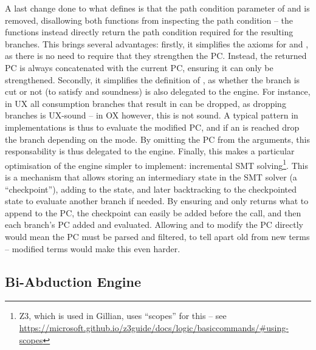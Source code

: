 A last change done to what \cite{cse2} defines is that the path condition parameter of  \consume{} and \produce{} is removed, disallowing both functions from inspecting the path condition -- the functions instead directly return the path condition required for the resulting branches. This brings several advantages: firstly, it simplifies the axioms for \consume{} and \produce{}, as there is no need to require that they strengthen the PC. Instead, the returned PC is always concatenated with the current PC, ensuring it can only be strengthened. Secondly, it simplifies the definition of \consume{}, as whether the branch is cut or not (to satisfy \OX{} and \UX{} soundness) is also delegated to the engine. For instance, in UX all consumption branches that result in \LFail{} can be dropped, as dropping branches is UX-sound -- in OX however, this is not sound. A typical pattern in \consume{} implementations is thus to evaluate the modified PC, and if an \LFail{} is reached drop the branch depending on the mode. By omitting the PC from the arguments, this responsability is thus delegated to the engine. Finally, this makes a particular optimisation of the engine simpler to implement: incremental SMT solving\footnote{Z3, which is used in Gillian, uses ``scopes'' for this -- see \url{https://microsoft.github.io/z3guide/docs/logic/basiccommands/\#using-scopes}}. This is a mechanism that allows storing an intermediary state in the SMT solver (a ``checkpoint''), adding to the state, and later backtracking to the checkpointed state to evaluate another branch if needed. By ensuring \consume{} and \produce{} only returns what to append to the PC, the checkpoint can easily be added before the call, and then each branch's PC added and evaluated. Allowing \consume{} and \produce{} to modify the PC directly would mean the PC must be parsed and filtered, to tell apart old from new terms -- modified terms would make this even harder.

\subsection{Bi-Abduction Engine}

